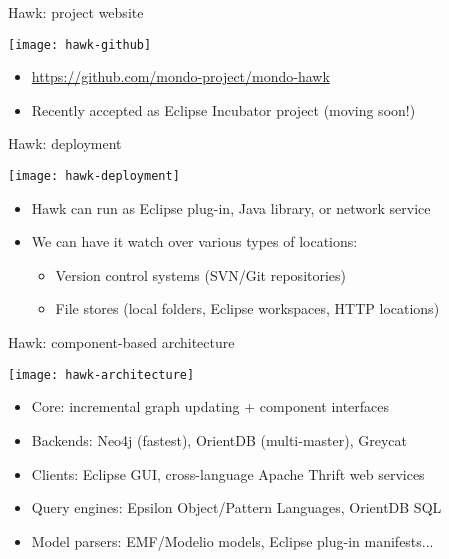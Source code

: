 \begin{frame}{Hawk: project website}
  \begin{center}
    \texttt{[image: hawk-github]}
  \end{center}

  \begin{itemize}
  \item \url{https://github.com/mondo-project/mondo-hawk}
  \item Recently accepted as Eclipse Incubator project (moving soon!)
  \end{itemize}
\end{frame}

\begin{frame}{Hawk: deployment}

  \begin{center}
    \texttt{[image: hawk-deployment]}
  \end{center}

  \begin{itemize}
  \item Hawk can run as Eclipse plug-in, Java library, or network service
  \item We can have it watch over various types of locations:
    \begin{itemize}
    \item Version control systems (SVN/Git repositories)
    \item File stores (local folders, Eclipse workspaces, HTTP locations)
    \end{itemize}
  \end{itemize}

\end{frame}

\begin{frame}{Hawk: component-based architecture}
  \begin{center}
    \texttt{[image: hawk-architecture]}
  \end{center}

  \begin{itemize}
  \item Core: incremental graph updating + component interfaces
  \item Backends: Neo4j (fastest), OrientDB (multi-master), Greycat
  \item Clients: Eclipse GUI, cross-language Apache Thrift web services
  \item Query engines: Epsilon Object/Pattern Languages, OrientDB SQL
  \item Model parsers: EMF/Modelio models, Eclipse plug-in manifests...
  \end{itemize}
\end{frame}

